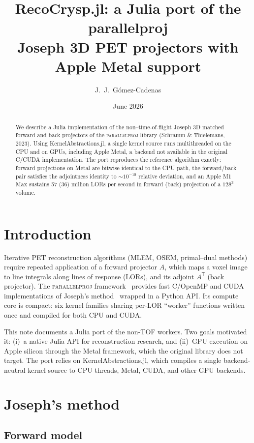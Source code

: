 \documentclass[11pt,a4paper]{article}
\title{RecoCrysp.jl: a Julia port of the parallelproj\\
  Joseph 3D PET projectors with Apple Metal support}
\author{J.~J.~G\'omez-Cadenas}
\date{June 2026}
\begin{document}
\maketitle

\begin{abstract}
We describe a Julia implementation of the non--time-of-flight Joseph 3D
matched forward and back projectors of the \textsc{parallelproj} library
(Schramm \& Thielemans, 2023). Using KernelAbstractions.jl, a single kernel
source runs multithreaded on the CPU and on GPUs, including Apple Metal,
a backend not available in the original C/CUDA implementation. The port
reproduces the reference algorithm exactly: forward projections on Metal are
bitwise identical to the CPU path, the forward/back pair satisfies the
adjointness identity to $\sim 10^{-10}$ relative deviation, and an Apple M1
Max sustains 57 (36) million LORs per second in forward (back) projection of
a $128^3$ volume.
\end{abstract}

\section{Introduction}

Iterative PET reconstruction algorithms (MLEM, OSEM, primal--dual methods)
require repeated application of a forward projector $A$, which maps a voxel
image to line integrals along lines of response (LORs), and its adjoint
$A^{\mathsf T}$ (back projector). The \textsc{parallelproj}
framework~\cite{schramm2023} provides fast C/OpenMP and CUDA implementations
of Joseph's method~\cite{joseph1982} wrapped in a Python API. Its compute
core is compact: six kernel families sharing per-LOR ``worker'' functions
written once and compiled for both CPU and CUDA.

This note documents a Julia port of the non-TOF workers. Two goals motivated
it: (i)~a native Julia API for reconstruction research, and (ii)~GPU execution
on Apple silicon through the Metal framework, which the original library does
not target. The port relies on KernelAbstractions.jl, which compiles a single
backend-neutral kernel source to CPU threads, Metal, CUDA, and other GPU
backends.

\section{Joseph's method}

\subsection{Forward model}
\end{document}
